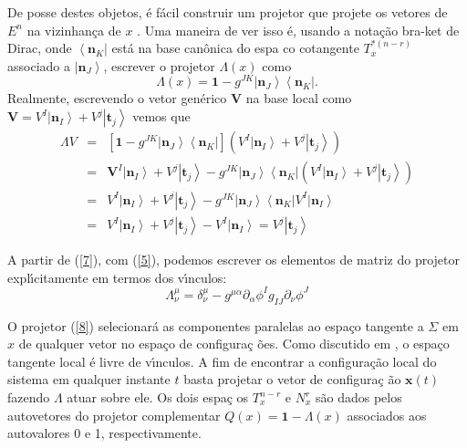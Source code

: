 \documentclass[a4paper,thmsa,12pt]{report}
\begin{document}
De posse destes objetos, \'{e} f\'{a}cil construir um projetor que projete
os vetores de $E^{n}$ na vizinhan\c{c}a de $x$ \cite{cma}. Uma maneira de
ver isso \'{e}, usando a nota\c{c}\~{a}o bra-ket de Dirac, onde $%
\left\langle \mathbf{n}_{K}\right| $ est\'{a} na base can\^{o}nica do espa\c{%
c}o cotangente $T_{x}^{\ast (n-r)}$ associado a $\left| \mathbf{n}%
_{J}\right\rangle $, escrever o projetor $\Lambda (x)$ como 
\begin{equation}
\Lambda (x)=\mathbf{1}-g^{JK}\left| \mathbf{n}_{J}\right\rangle \left\langle 
\mathbf{n}_{K}\right| .  \label{7}
\end{equation}
Realmente, escrevendo o vetor gen\'{e}rico $\mathbf{V}$ na base local como $%
\mathbf{V=}V^{I}\left| \mathbf{n}_{I}\right\rangle +V^{j}\left| \mathbf{t}%
_{j}\right\rangle$ vemos que 
\begin{eqnarray*}
\Lambda V &=&\left[ \mathbf{1}-g^{JK}\left| \mathbf{n}_{J}\right\rangle
\left\langle \mathbf{n}_{K}\right| \right] \left( V^{I}\left| \mathbf{n}%
_{I}\right\rangle +V^{j}\left| \mathbf{t}_{j}\right\rangle \right) \\
&=& \mathbf{V}^{I}\left| \mathbf{n}_{I}\right\rangle +V^{j}\left| \mathbf{t}%
_{j}\right\rangle -g^{JK}\left| \mathbf{n}_{J}\right\rangle \left\langle 
\mathbf{n}_{K}\right| \left( V^{I}\left| \mathbf{n}_{I}\right\rangle
+V^{j}\left| \mathbf{t}_{j}\right\rangle \right) \\
&=& V^{I}\left| \mathbf{n}_{I}\right\rangle +V^{j}\left| \mathbf{t}%
_{j}\right\rangle -g^{JK}\left| \mathbf{n}_{J}\right\rangle \left\langle 
\mathbf{n}_{K}\right| V^{I}\left| \mathbf{n}_{I}\right\rangle \\
&=& V^{I}\left| \mathbf{n}_{I}\right\rangle +V^{j}\left| \mathbf{t}%
_{j}\right\rangle -V^{I}\left| \mathbf{n}_{I}\right\rangle =V^{j}\left| 
\mathbf{t}_{j}\right\rangle
\end{eqnarray*}

A partir de (\ref{7}), com (\ref{5}), podemos escrever os elementos de
matriz do projetor expl\'{\i}citamente em termos dos v\'{\i}nculos: 
\begin{equation}
\Lambda _{\nu }^{\mu }=\delta _{\nu }^{\mu }-g^{\mu \alpha }\partial
_{\alpha }\phi ^{I}g_{IJ}\partial _{\nu }\phi ^{J}  \label{8}
\end{equation}

O projetor (\ref{8}) selecionar\'{a} as componentes paralelas ao espa\c{c}o
tangente a $\Sigma $ em $x$ de qualquer vetor no espa\c{c}o de configura\c{c}%
\~{o}es. Como discutido em \cite{cma}, o espa\c{c}o tangente local \'{e}
livre de v\'{\i}nculos. A fim de encontrar a configura\c{c}\~{a}o local do
sistema em qualquer instante $t$ basta projetar o vetor de configura\c{c}%
\~{a}o $\mathbf{x}(t)$ fazendo $\Lambda $ atuar sobre ele. Os dois espa\c{c}%
os $T_{x}^{n-r}$ e $N_{x}^{r}$ s\~{a}o dados pelos autovetores do projetor
complementar $Q(x)=\mathbf{1}-\Lambda (x)$ associados aos autovalores 0 e 1,
respectivamente.
\end{document}
